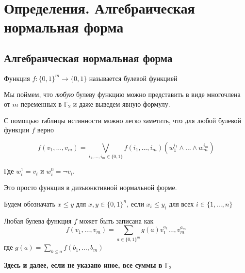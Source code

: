 
\section{Определения. Алгебраическая нормальная форма}
\subsection{Алгебраическая нормальная форма}
\begin{definition}
Функция $f: \{0,1\}^m \to \{0,1\}$ называется булевой функцией
\end{definition}

Мы поймем, что \emph{любую} булеву функцию можно представить в виде 
многочлена от $m$ переменных в $\mathbb{F}_2$ и даже выведем явную формулу. 

С помощью таблицы истинности можно легко заметить, что для любой булевой
функции $f$ верно

$$f(v_1, \ldots, v_m) = \bigvee\limits_{i_1, \ldots, i_m \in \{0,1\}}
       f(i_1, \ldots, i_m) (w_1^{i_1} \land \ldots \land w_m^{i_m})$$

Где $w_i^1 = v_i$ и $w_i^0 = \lnot v_i$.

Это просто функция в дизъюнктивной нормальной форме.

\begin{definition}
Будем обозначать $x \le y$ для $x,y \in \{0,1\}^n$, если $x_i \le y_i$ для 
всех $i \in \{1,\ldots,n\}$
\end{definition}

\begin{theorem}
\label{mebius}
Любая булева функция $f$ может быть записана как
$$f(v_1, \ldots, v_m) = \sum\limits_{a \in \{0,1\}^m} g(a) v_1^{a_1}
 \ldots, v_m^{a_m}$$ где $g(a) = \sum\limits_{b \le a} f(b_1, \ldots, b_m)$

{\bfseries Здесь и далее, если не указано иное, все суммы в $\mathbb{F}_2$}
\end{theorem}


